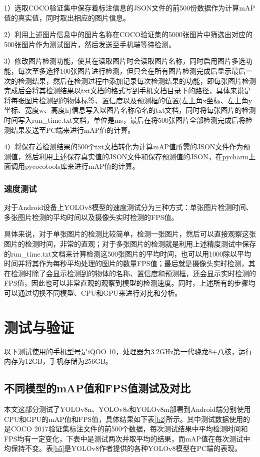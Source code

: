 \documentclass{ctexart}
\numberwithin{equation}{section}%
\numberwithin{figure}{section}%
\numberwithin{table}{section}%
\begin{document}
	1）选取COCO验证集中保存着标注信息的JSON文件的前500份数据作为计算mAP值的真实值，同时取出相应的图片信息。

	2）利用上述图片信息中的图片名称在COCO验证集的5000张图片中筛选出对应的500张图片作为测试图片，然后发送至手机端等待检测。

	3）修改图片检测功能，使其在读取图片时会读取图片名称，同时启用图片多选功能，每次至多选择100张图片进行检测，但只会在所有图片检测完成后显示最后一次的检测结果，然后在检测过程中添加记录每次检测结果的功能，即每张图片检测完成后会将其检测结果以txt文档的格式写到手机文档目录下的路径，具体来说是将每张图片检测到的物体标签、置信度以及预测框的位置(左上角x坐标、左上角y坐标、宽度w、高度h)信息写入以图片名称命名的txt文档，同时将每张图片的检测时间写入run\_time.txt文档，单位是ms，最后在将500张图片全部检测完成后将检测结果发送至PC端来进行mAP值的计算。
	
	
	4）将保存着检测结果的500个txt文档转化为计算mAP值所需的JSON文件作为预测值，然后利用上述保存真实值的JSON文件和保存预测值的JSON，在pycharm上面调用pycocotools库来进行mAP值的计算。
	
	\subsubsection{速度测试}
	对于Android设备上YOLOv8模型的速度测试分为三种方式：单张图片检测时间、多张图片检测的平均时间以及摄像头实时检测的FPS值。
	
	具体来说，对于单张图片的检测比较简单，检测一张图片，然后可以直接观察这张图片的检测时间，非常的直观；对于多张图片的检测就是利用上述精度测试中保存的run\_time.txt文档来计算检测这500张图片的平均时间，也可以用1000除以平均时间并将其作为每秒平均处理的图片的数量FPS值；最后就是摄像头实时检测，其在检测时除了会显示检测到的物体的名称、置信度和预测框，还会显示实时检测的FPS值，因此也可以非常直观的观察到模型的检测速度。同时，上述所有的步骤均可以通过切换不同模型、CPU和GPU来进行对比和分析。
	
%	
	\newpage
	\section{测试与验证}
	以下测试使用的手机型号是iQOO 10，处理器为3.2GHz第一代骁龙8+八核，运行内存为12GB，手机存储为256GB。
	\subsection{不同模型的mAP值和FPS值测试及对比}
	本文这部分测试了YOLOv8n、YOLOv8s和YOLOv8m部署到Android端分别使用CPU和GPU的mAP值和FPS值，具体结果如下表\ref{b2}所示。其中测试数据使用的是COCO 2017验证集标注文件的前500个数据，每次测试结果中平均检测时间和FPS均有一定变化，下表中是测试两次并取平均的结果，而mAP值在每次测试中均保持不变。表\ref{b5}是YOLOv8作者提供的各种YOLOv8模型在PC端的表现。
	
\end{document}
